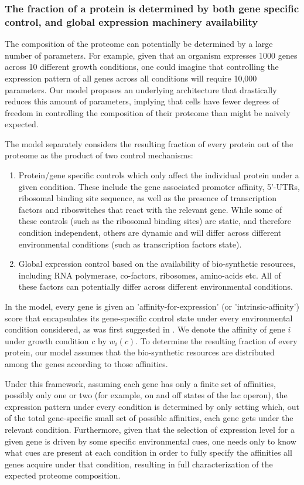 \subsubsection{The fraction of a protein is determined by both gene specific control, and global
expression machinery availability}
The composition of the proteome can potentially be determined by a large number of parameters.
For example, given that an organism expresses 1000 genes across 10 different growth conditions, one could imagine that controlling the expression pattern of all genes across all conditions will require 10,000 parameters.
Our model proposes an underlying architecture that drastically reduces this amount of parameters, implying that cells have fewer degrees of freedom in controlling the composition of their proteome than might be naively expected.

The model separately considers the resulting fraction of every protein out of the proteome as the product of two control mechanisms:
\begin{enumerate}
\item Protein/gene specific controls which only affect the individual protein under a given condition. These include the gene associated promoter affinity, 5'-UTRs, ribosomal binding site sequence, as well as the presence of transcription factors and riboswitches that react with the relevant gene.
  While some of these controls (such as the ribosomal binding sites) are static, and therefore condition independent, others are dynamic and will differ across different environmental conditions (such as transcription factors state).
\item Global expression control based on the availability of bio-synthetic resources, including RNA polymerase, co-factors, ribosomes, amino-acids etc.
  All of these factors can potentially differ across different environmental conditions.
\end{enumerate}

In the model, every gene is given an 'affinity-for-expression' (or 'intrinsic-affinity') score that encapsulates its gene-specific control state under every environmental condition considered, as was first suggested in \cite{Maaloe1969}.
We denote the affinity of gene $i$ under growth condition $c$ by $w_i(c)$.
To determine the resulting fraction of every protein, our model assumes that the bio-synthetic resources are distributed among the genes according to those affinities.

Under this framework, assuming each gene has only a finite set of affinities, possibly only one or two (for example, on and off states of the lac operon), the expression pattern under every condition is determined by only setting which, out of the total gene-specific small set of possible affinities, each gene gets under the relevant condition.
Furthermore, given that the selection of expression level for a given gene is driven by some specific environmental cues, one needs only to know what cues are present at each condition in order to fully specify the affinities all genes acquire under that condition, resulting in full characterization of the expected proteome composition.
